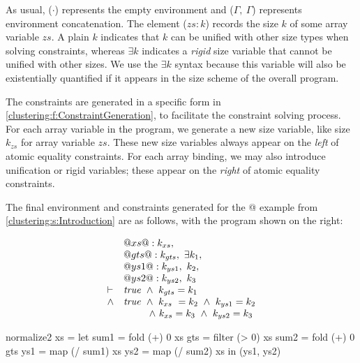 As usual, ($\cdot$) represents the empty environment and ($\Gamma,~ \Gamma$) represents environment concatenation.
The element ($zs : k$) records the size $k$ of some array variable $zs$.
A plain $k$ indicates that $k$ can be unified with other size types when solving constraints, whereas $\exists k$ indicates a  \emph{rigid} size variable that cannot be unified with other sizes.
We use the $\exists k$ syntax because this variable will also be existentially quantified if it appears in the size scheme of the overall program.

The constraints are generated in a specific form in \cref{clustering:f:ConstraintGeneration}, to facilitate the constraint solving process.
For each array variable in the program, we generate a new size variable, like size $k_{zs}$ for array variable $zs$.
These new size variables always appear on the \emph{left} of atomic equality constraints.
For each array binding, we may also introduce unification or rigid variables; these appear on the \emph{right} of atomic equality constraints.

The final environment and constraints generated for the @ example from \cref{clustering:s:Introduction} are as follows, with the program shown on the right:

\begin{minipage}{0.5\textwidth}
$$
\begin{array}{ll}
   & @xs @ : k_{xs},~
\\ & @gts@ : k_{gts},~ \exists k_1,
\\ & @ys1@ : k_{ys1},~ k_2,
\\ & @ys2@ : k_{ys2},~ k_3
\\
\vdash & \mathit{true} 
        ~\wedge~  k_{gts} = k_1
\\ \wedge & \mathit{true}
        ~ \wedge~  k_{xs}  ~= k_2
        ~ \wedge~  k_{ys1}  = k_2 
\\     &~~~~~~~\; 
          \wedge~  k_{xs}   = k_3
        ~ \wedge~  k_{ys2}  = k_3
\end{array}
$$
\end{minipage}
\begin{minipage}{0.5\textwidth}
\begin{haskell}
normalize2 xs
 = let sum1 = fold   (+)  0   xs
       gts  = filter (>   0)  xs
       sum2 = fold   (+)  0   gts
       ys1  = map    (/ sum1) xs
       ys2  = map    (/ sum2) xs
   in (ys1, ys2)
\end{haskell}
\end{minipage}

